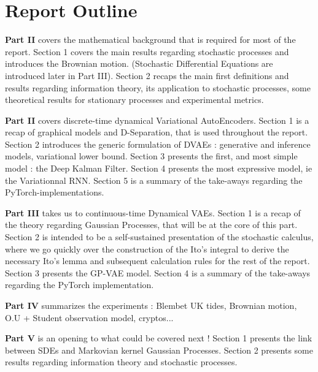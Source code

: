 \chapter{Report Outline}\label{sec:outline}

\textbf{Part II} covers the mathematical background that is required for most of the report. Section 1 covers the main results regarding stochastic processes and introduces the Brownian motion. (Stochastic Differential Equations are introduced later in Part III). Section 2 recaps the main first definitions and results regarding information theory, its application to stochastic processes, some theoretical results for stationary processes and experimental metrics.

\textbf{Part II} covers discrete-time dynamical Variational AutoEncoders. Section 1 is a recap of graphical models and D-Separation, that is used throughout the report. Section 2 introduces the generic formulation of DVAEs : generative and inference models, variational lower bound. Section 3 presents the first, and most simple model : the Deep Kalman Filter. Section 4 presents the most expressive model, ie the Variationnal RNN. Section 5 is a summary of the take-aways regarding the PyTorch-implementations.

\textbf{Part III} takes us to continuous-time Dynamical VAEs. Section 1 is a recap of the theory regarding Gaussian Processes, that will be at the core of this part. Section 2 is intended to be a self-sustained presentation of the stochastic calculus, where we go quickly over the construction of the Ito's integral to derive the necessary Ito's lemma and subsequent calculation rules for the rest of the report.  Section 3 presents the GP-VAE model. Section 4 is a summary of the take-aways regarding the PyTorch implementation.

\textbf{Part IV} summarizes the experiments : Blembet UK tides, Brownian motion, O.U + Student observation model, cryptos...

\textbf{Part V} is an opening to what could be covered next ! Section 1 presents the link between SDEs and Markovian kernel Gaussian Processes. Section 2 presents some results regarding information theory and stochastic processes.